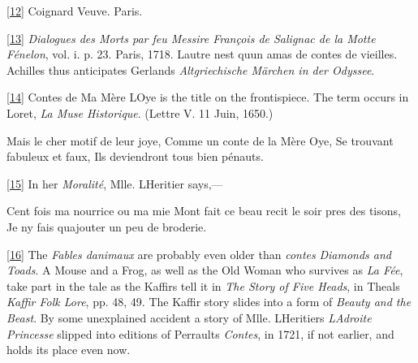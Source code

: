 \documentclass[14pt,a4paper]{memoir}
\begin{document}
\protect\hypertarget{4533318093929944247_33931-h-0.htm.xhtmlux5cux23Footnote_12}{}{}\protect\hyperlink{4533318093929944247_33931-h-0.htm.xhtmlux5cux23FNanchor_12}{{{[}12{]}}}
Coignard Veuve. Paris.

\protect\hypertarget{4533318093929944247_33931-h-0.htm.xhtmlux5cux23Footnote_13}{}{}\protect\hyperlink{4533318093929944247_33931-h-0.htm.xhtmlux5cux23FNanchor_13}{{{[}13{]}}}
\emph{Dialogues des Morts par feu Messire François de Salignac de la
Motte Fénelon}, vol. i. p. 23. Paris, 1718.
\textquotesingle L\textquotesingle autre n\textquotesingle est
qu\textquotesingle un amas de contes de vieilles.\textquotesingle{}
Achilles thus anticipates Gerland\textquotesingle s \emph{Altgriechische
Märchen in der Odyssee}.

\protect\hypertarget{4533318093929944247_33931-h-0.htm.xhtmlux5cux23Footnote_14}{}{}\protect\hyperlink{4533318093929944247_33931-h-0.htm.xhtmlux5cux23FNanchor_14}{{{[}14{]}}}
Contes de Ma Mère L\textquotesingle Oye is the title on the
frontispiece. The term occurs in Loret, \emph{La Muse Historique}.
(Lettre V. 11 Juin, 1650.)

{\textquotesingle Mais le cher motif de leur joye,} {Comme un conte de
la Mère Oye,} {Se trouvant fabuleux et faux,} {Ils deviendront tous bien
pénauts.\textquotesingle{}}

\protect\hypertarget{4533318093929944247_33931-h-0.htm.xhtmlux5cux23Footnote_15}{}{}\protect\hyperlink{4533318093929944247_33931-h-0.htm.xhtmlux5cux23FNanchor_15}{{{[}15{]}}}
In her \emph{Moralité}, Mlle. L\textquotesingle Heritier says,---

{\textquotesingle Cent fois ma nourrice ou ma mie}
{M\textquotesingle ont fait ce beau recit le soir pres des tisons, } {Je
n\textquotesingle y fais qu\textquotesingle ajouter un peu de
broderie.\textquotesingle{}}

\protect\hypertarget{4533318093929944247_33931-h-0.htm.xhtmlux5cux23Footnote_16}{}{}\protect\hyperlink{4533318093929944247_33931-h-0.htm.xhtmlux5cux23FNanchor_16}{{{[}16{]}}}
The \emph{Fables d\textquotesingle animaux} are probably even older than
\emph{contes} \emph{Diamonds and Toads}. A Mouse and a Frog, as well as
the Old Woman who survives as \emph{La Fée}, take part in the tale as
the Kaffirs tell it in \emph{The Story of Five Heads}, in
Theal\textquotesingle s \emph{Kaffir Folk Lore}, pp. 48, 49. The Kaffir
story slides into a form of \emph{Beauty and the Beast}. By some
unexplained accident a story of Mlle.
L\textquotesingle Heritier\textquotesingle s
\emph{L\textquotesingle Adroite Princesse} slipped into editions of
Perrault\textquotesingle s \emph{Contes}, in 1721, if not earlier, and
holds its place even now.
\end{document}
